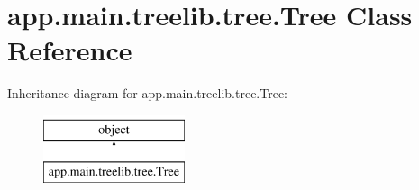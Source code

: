 \hypertarget{classapp_1_1main_1_1treelib_1_1tree_1_1Tree}{}\section{app.\+main.\+treelib.\+tree.\+Tree Class Reference}
\label{classapp_1_1main_1_1treelib_1_1tree_1_1Tree}
Inheritance diagram for app.\+main.\+treelib.\+tree.\+Tree\+:\begin{figure}[H]
\begin{center}
\leavevmode
\includegraphics[height=2.000000cm]{classapp_1_1main_1_1treelib_1_1tree_1_1Tree}
\end{center}
\end{figure}
